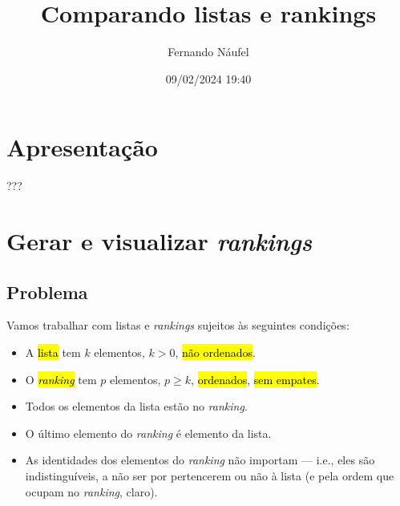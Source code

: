 \documentclass[
  letterpaper,
  DIV=11,
  numbers=noendperiod]{scrreprt}
\title{Comparando listas e rankings}
\author{Fernando Náufel}
\date{09/02/2024 19:40}
\renewcommand*\contentsname{Índice}
\newcommand\contentsname{Índice}
\begin{document}
\maketitle

\makeatletter
{}
{}
{}
\makeatother


\renewcommand*\contentsname{Índice}
{
\hypersetup{linkcolor=}
\setcounter{tocdepth}{2}
\tableofcontents
}

\chapter*{Apresentação}\label{apresentauxe7uxe3o}


???


\chapter{\texorpdfstring{Gerar e visualizar
\emph{rankings}}{Gerar e visualizar rankings}}\label{gerar-e-visualizar-rankings}

\section{Problema}\label{problema}

Vamos trabalhar com listas e \emph{rankings} sujeitos às seguintes
condições:

\begin{itemize}
\item
  A {\hl{lista}} tem $k$ elementos, $k > 0$, {\hl{não ordenados}}.
\item
  O {\hl{\emph{ranking}}} tem $p$ elementos, $p \geq k$,
  {\hl{ordenados}}, {\hl{sem empates}}.
\item
  Todos os elementos da lista estão no \emph{ranking}.
\item
  O último elemento do \emph{ranking} é elemento da lista.
\item
  As identidades dos elementos do \emph{ranking} não importam --- i.e.,
  eles são indistinguíveis, a não ser por pertencerem ou não à lista (e
  pela ordem que ocupam no \emph{ranking}, claro).
\end{itemize}
\end{document}
